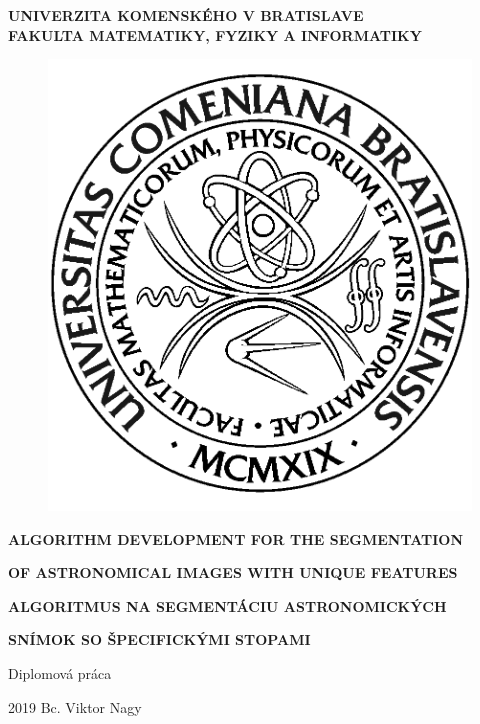 \documentclass[12pt, a4paper, oneside]{book}
\newcommand\mfthesistype{Diplomová práca}
\newcommand\mfauthor{Bc. Viktor Nagy}
\newcommand\mfuniversity{UNIVERZITA KOMENSKÉHO V BRATISLAVE}
\newcommand\mffaculty{FAKULTA MATEMATIKY, FYZIKY A INFORMATIKY}
\begin{document}
\frontmatter


\noindent
\begin{minipage}{\textwidth}
\begin{center}
\textbf{\mfuniversity \\
\mffaculty}
\end{center}
\end{minipage}

\vfill
\begin{figure}[!hbt]
    \begin{center}
        \includegraphics{images/logo_fmph}
        \label{img:logo}
    \end{center}
\end{figure}
\begin{center}
    \begin{minipage}{0.8\textwidth}
        \centerline{\textbf{\Large\MakeUppercase{Algorithm development for the segmentation}}}
        \centerline{\textbf{\Large\MakeUppercase{of astronomical images with unique features}}}
        \smallskip
        \smallskip
        \smallskip
        \smallskip
        \centerline{\textbf{\Large\MakeUppercase{Algoritmus na segmentáciu astronomických}}}
        \centerline{\textbf{\Large\MakeUppercase{snímok so špecifickými stopami}}}
        \smallskip
        \centerline{\mfthesistype}
    \end{minipage}
\end{center}
\vfill
2019 \hfill
\mfauthor
\eject
\end{document}
